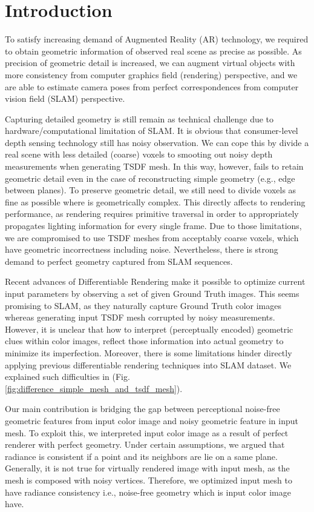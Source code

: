 \section{Introduction}

To satisfy increasing demand of 
Augmented Reality (AR) technology, we required to obtain geometric information of observed real scene as precise as possible. 
As precision of geometric detail is increased, we can augment virtual objects with more consistency from computer graphics field (rendering) perspective, and we are able to estimate camera poses from perfect correspondences from computer vision field (SLAM) perspective.

Capturing detailed geometry is still remain as technical challenge due to hardware/computational limitation of SLAM. 
It is obvious that consumer-level depth sensing technology still has noisy observation. 
We can cope this by divide a real scene with less detailed (coarse) voxels to smooting out noisy depth measurements when generating TSDF mesh. 
In this way, however, fails to retain geometric detail even in the case of reconstructing simple geometry (e.g., edge between planes).
To preserve geometric detail, we still need to divide voxels as fine as possible where is geometrically complex. 
This directly affects to rendering performance, as rendering requires primitive traversal in order to appropriately propagates lighting information for every single frame. 
Due to those limitations, we are compromised to use TSDF meshes from acceptably coarse voxels, which have geometric incorrectness including noise. 
Nevertheless, there is strong demand to perfect geometry captured from SLAM sequences. 

Recent advances of Differentiable Rendering make it possible to optimize current input parameters by observing a set of given Ground Truth images. 
This seems promising to SLAM, as they naturally capture Ground Truth color images whereas generating input TSDF mesh corrupted by noisy measurements. 
However, it is unclear that how to interpret (perceptually encoded) geometric clues within color images, reflect those information into actual geometry to minimize its imperfection. 
Moreover, there is some limitations hinder directly applying previous differentiable rendering techniques into SLAM dataset. 
We explained such difficulties in (Fig. \ref{fig:difference_simple_mesh_and_tsdf_mesh}).

Our main contribution is bridging the gap between perceptional noise-free geometric features from input color image and noisy geometric feature in input mesh. 
To exploit this, we interpreted input color image as a result of perfect renderer with perfect geometry. 
Under certain assumptions, we argued that radiance is consistent if a point and its neighbors are lie on a same plane.
Generally, it is not true for virtually rendered image with input mesh, as the mesh is composed with noisy vertices.
Therefore, we optimized input mesh to have radiance consistency i.e., noise-free geometry which is input color image have.

